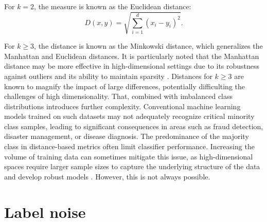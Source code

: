 \documentclass[12pt]{book}
\begin{document}
For $k=2$, the measure is known as the Euclidean distance:
\[
D(x,y) = \sqrt{\sum_{i=1}^{d} (x_i - y_i)^2}.
\]

For $k \geq 3$, the distance is known as the Minkowski distance, which generalizes the Manhattan and Euclidean distances. It is particularly noted that the Manhattan distance may be more effective in high-dimensional settings due to its robustness against outliers and its ability to maintain sparsity \citep{he2009learning}. Distances for $k \geq 3$ are known to magnify the impact of large differences, potentially difficulting the challenges of high dimensionality. That, combined with imbalanced class distributions introduces further complexity. Conventional machine learning models trained on such datasets may not adequately recognize critical minority class samples, leading to significant consequences in areas such as fraud detection, disaster management, or disease diagnosis. The predominance of the majority class in distance-based metrics often limit classifier performance. Increasing the volume of training data can sometimes mitigate this issue, as high-dimensional spaces require larger sample sizes to capture the underlying structure of the data and develop robust models \citep{braga2020fundamentals}. However, this is not always possible.




\section{Label noise}

\end{document}
